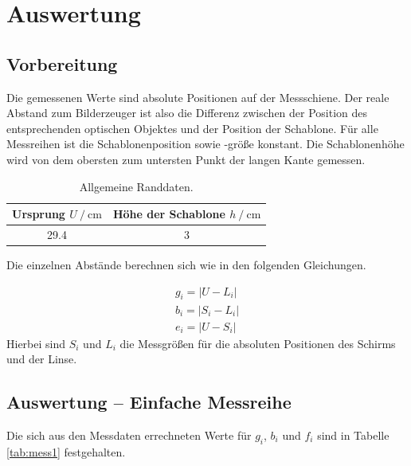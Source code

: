 \section{Auswertung}
\label{sec:Auswertung}

\subsection{Vorbereitung}
Die gemessenen Werte sind absolute Positionen auf der Messschiene. Der reale Abstand zum Bilderzeuger ist also die Differenz zwischen der Position des entsprechenden optischen Objektes
und der Position der Schablone. Für alle Messreihen ist die Schablonenposition sowie -größe konstant. Die Schablonenhöhe wird von dem obersten zum untersten Punkt der langen Kante gemessen.

\begin{table}
    \centering
    \caption{Allgemeine Randdaten.}
    \begin{tabular}{c c}
        \toprule
        {Ursprung $U \:/\: \si{\centi\meter}$} & Höhe der Schablone $h \:/\: \si{\centi\meter}$\\
        \midrule
        29.4 & 3 \\
    \end{tabular}
    \label{tab:rand}
\end{table}

Die einzelnen Abstände berechnen sich wie in den folgenden Gleichungen.

\begin{equation}
    \begin{gathered}
        g_i = |U - L_i| \\
        b_i = |S_i - L_i| \\
        e_i = |U - S_i|
    \end{gathered}
    \label{eqn:abstand}
\end{equation}
Hierbei sind $S_i$ und $L_i$ die Messgrößen für die absoluten Positionen des Schirms und der Linse.

\subsection{Auswertung -- Einfache Messreihe}
Die sich aus den Messdaten errechneten Werte für $g_i$, $b_i$ und $f_i$ sind in Tabelle \ref{tab:mess1} festgehalten.

